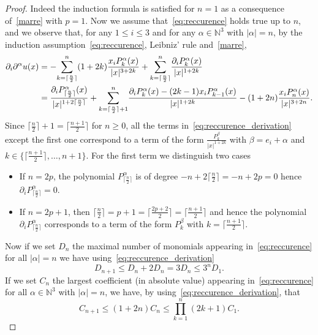 \documentclass[AHL,Unicode,longabstracts,published]{cedram}
\newcommand{\N}{\mathbb{N}}
\renewcommand{\leq}{\leqslant}
\renewcommand{\geq}{\geqslant}
\begin{document}
\begin{proof}
Indeed the induction formula is satisfied for $n=1$ as a consequence of~\eqref{marre} with $p=1$. Now we assume that~\eqref{eq:reccurence} holds true up to $n$, and we observe that, for any $1 \leq i \leq 3$ and for any $\alpha \in \N^3$ with $|\alpha|=n$, by the induction assumption~\eqref{eq:reccurence}, Leibniz' rule and~\eqref{marre},
\begin{equation}\label{eq:reccurence_derivation}
\begin{split}
\partial_i \partial^\alpha u(x)&= - \underset{k=\lceil \frac{n}{2}\rceil}{\overset{n}{\sum}} (1+2k)\frac{x_i P_k^\alpha(x)}{|x|^{3+2k}}+\underset{k=\lceil\frac{n}{2}\rceil}{\overset{n}{\sum}} \frac{\partial_i P_k^\alpha(x)}{|x|^{1+2k}} \notag \\
&= \frac{\partial_i P^\alpha_{\lceil\frac{n}{2}\rceil}(x)}{|x|^{1+2\lceil\frac{n}{2}\rceil}} + \underset{k=\lceil\frac{n}{2}\rceil+1}{\overset{n}{\sum}} \frac{\partial_i P^\alpha_k(x)-(2k-1)x_i P^\alpha_{k-1}(x)}{|x|^{1+2k}} - (1+2n)\frac{x_i P_n^\alpha(x)}{|x|^{3+2n}}.
\end{split}
\end{equation}
Since $\lceil \frac{n}{2} \rceil+1= \lceil \frac{n+1}{2} \rceil$ for $n\geq0$, all the terms in~\eqref{eq:reccurence_derivation} except the first one correspond to a term of the form $\frac{P_k^\beta}{|x|^{1+2k}} $ with $\beta=e_i+\alpha$ and $k\in \{\lceil \frac{n+1}{2} \rceil,\dots,n+1 \}$. For the first term we distinguish two cases
\begin{itemize}
\item If $n=2p$, the polynomial $P_{\lceil \frac{n}{2} \rceil}^\alpha$ is of degree $-n+ 2\lceil \frac{n}{2} \rceil=-n+2p=0 $ hence $\partial_i P_{\lceil \frac{n}{2} \rceil}^\alpha=0 $.
\item If $n=2p+1$, then $\lceil \frac{n}{2} \rceil=p+1=\lceil \frac{2p+2}{2} \rceil=\lceil \frac{n+1}{2} \rceil$ and hence the polynomial $\partial_i P_{\lceil \frac{n}{2} \rceil}^\alpha$ corresponds to a term of the form $P_k^\beta$ with $k=\lceil \frac{n+1}{2} \rceil$.
\end{itemize}
Now if we set $D_n$ the { maximal number of monomials appearing in}~\eqref{eq:reccurence} for all $|\alpha|=n$ we have using~\eqref{eq:reccurence_derivation}
\[
D_{n+1} \leq D_n + 2 D_n = 3 D_n \leq 3^{n} D_1.
\]
If we set $C_n$ the largest coefficient (in absolute value) appearing in~\eqref{eq:reccurence} for all $\alpha \in \N^3$ with $|\alpha|=n$, we have, by using~\eqref{eq:reccurence_derivation}, that
\[
C_{n+1} \leq (1+2n) C_{n} \leq \underset{k=1}{\overset{n}{\prod}} (2k+1) C_1.
\]
\end{proof}
\end{document}
